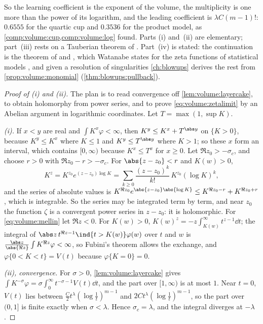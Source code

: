 \begin{refsection}
So the learning coefficient is the exponent of the volume, the multiplicity is one more than the power of its logarithm, and the leading coefficient is $\lambda C(m-1)!$: $0.6555$ for the quartic cup and $0.3536$ for the product model, as \cref{comp:volume:cup,comp:volume:log} found. Parts (i) and~(ii) are elementary; part~(iii) rests on a Tauberian theorem of \textcite{Delange1954}. Part~(iv) is stated: the continuation is the theorem of \textcite{BernsteinGelfand1969} and \textcite{Atiyah1970}, which Watanabe states for the zeta functions of statistical models \parencite[p.~3584]{Watanabe2010}, and given a resolution of singularities \cref{ch:blowups} derives the rest from \cref{prop:volume:monomial} (\cref{thm:blowups:pullback}).

\begin{proof}[Proof of (i) and (ii)]
The plan is to read convergence off \cref{lem:volume:layercake}, to obtain holomorphy from power series, and to prove \eqref{eq:volume:zetalimit} by an Abelian argument in logarithmic coordinates. Let $T=\max(1,\sup K)$.

\emph{(i).} If $x<y$ are real and $\int K^x\varphi<\infty$, then $K^y\le K^x+T^{\abs y}$ on $\{K>0\}$, because $K^y\le K^x$ where $K\le1$ and $K^y\le T^{\abs y}$ where $K>1$; so these $x$ form an interval, which contains $[0,\infty)$ because $K^x\le T^x$ for $x\ge0$. Let $\Re z_0>-\sigma_c$, and choose $r>0$ with $\Re z_0-r>-\sigma_c$. For $\abs{z-z_0}<r$ and $K(w)>0$,
\[
K^z=K^{z_0}e^{(z-z_0)\log K}=\sum_{k\ge0}\frac{(z-z_0)^k}{k!}\,K^{z_0}(\log K)^k,
\]
and the series of absolute values is $K^{\Re z_0}e^{\abs{z-z_0}\abs{\log K}}\le K^{\Re z_0-r}+K^{\Re z_0+r}$, which is integrable. So the series may be integrated term by term, and near $z_0$ the function $\zeta$ is a convergent power series in $z-z_0$: it is holomorphic. For \eqref{eq:volume:mellin} let $\Re z<0$. For $K(w)>0$, $K(w)^z=-z\int_{K(w)}^\infty t^{z-1}\dd t$; the integral of $\abs z\,t^{\Re z-1}\ind\{t>K(w)\}\varphi(w)$ over $t$ and $w$ is $\frac{\abs z}{\abs{\Re z}}\int K^{\Re z}\varphi<\infty$, so Fubini's theorem allows the exchange, and $\varphi\{0<K<t\}=V(t)$ because $\varphi\{K=0\}=0$.

\emph{(ii), convergence.} For $\sigma>0$, \cref{lem:volume:layercake} gives $\int K^{-\sigma}\varphi=\sigma\int_0^\infty t^{-\sigma-1}V(t)\dd t$, and the part over $[1,\infty)$ is at most $1$. Near $t=0$, $V(t)$ lies between $\frac C2t^\lambda(\log\frac1t)^{m-1}$ and $2Ct^\lambda(\log\frac1t)^{m-1}$, so the part over $(0,1]$ is finite exactly when $\sigma<\lambda$. Hence $\sigma_c=\lambda$, and the integral diverges at $-\lambda$.


\end{proof}
\end{refsection}
